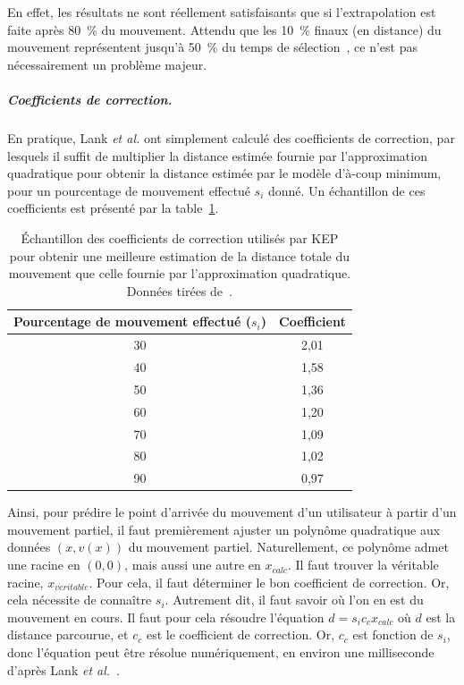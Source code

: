 	En effet, les résultats ne sont réellement satisfaisants que si l'extrapolation est faite après 80~\%{} du mouvement. Attendu que les 10~\%{} finaux (en distance) du mouvement représentent jusqu'à 50~\%{} du temps de sélection~\cite{mackenzie1987three, graham1996physical}, ce n'est pas nécessairement un problème majeur.
	
	\subparagraph{Coefficients de correction.}
	En pratique, Lank \emph{et al.} ont simplement calculé des coefficients de correction, par lesquels il suffit de multiplier la distance estimée fournie par l'approximation quadratique pour obtenir la distance estimée par le modèle d'à-coup minimum, pour un pourcentage de mouvement effectué $s_{i}$ donné. Un échantillon de ces coefficients est présenté par la table~\ref{tab:kepCoeffs}.
	
	\begin{table}
	\centering
	\begin{tabular}{c c}
		Pourcentage de mouvement effectué ($s_{i}$)	& Coefficient	\bigstrut[b] \\ \hline
		30												& 2,01			\bigstrut[t] \\
		40												& 1,58			\\
		50												& 1,36			\\
		60												& 1,20			\\
		70												& 1,09			\\
		80												& 1,02			\\
		90												& 0,97			\\		
	\end{tabular}
	\caption[KEP -- coefficients de correction]{Échantillon des coefficients de correction utilisés par KEP pour obtenir une meilleure estimation de la distance totale du mouvement que celle fournie par l'approximation quadratique. Données tirées de~\cite{lank2007endpoint}.}
	\label{tab:kepCoeffs}
	\end{table}
	
	Ainsi, pour prédire le point d'arrivée du mouvement d'un utilisateur à partir d'un mouvement partiel, il faut premièrement ajuster un polynôme quadratique aux données $(x, v(x))$ du mouvement partiel. Naturellement, ce polynôme admet une racine en $(0,0)$, mais aussi une autre en $x_{calc}$. Il faut trouver la véritable racine, $x_{v\acute{e}ritable}$. Pour cela, il faut déterminer le bon coefficient de correction. Or, cela nécessite de connaître $s_{i}$. Autrement dit, il faut savoir où l'on en est du mouvement en cours. Il faut pour cela résoudre l'équation $d = s_{i}c_{c}x_{calc}$ où $d$ est la distance parcourue, et $c_{c}$ est le coefficient de correction. Or, $c_{c}$ est fonction de $s_{i}$, donc l'équation peut être résolue numériquement, en environ une milliseconde d'après Lank \emph{et al.}~\cite{lank2007endpoint}.
	
